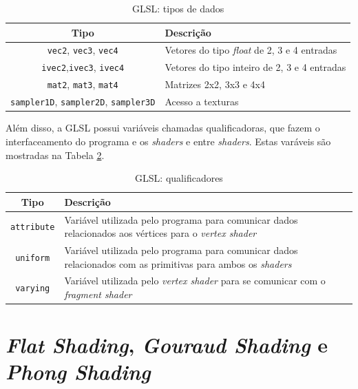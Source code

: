 \begin{table}[h]
	\centering	
	\begin{tabularx}{0.9\textwidth}{cX}
		\toprule
		\textbf{Tipo} & \textbf{Descrição}  \\
		\midrule
		\texttt{vec2}, \texttt{vec3}, \texttt{vec4} & Vetores do tipo \textit{float} de 2, 3 e 4 entradas \\
		\texttt{ivec2},\texttt{ivec3}, \texttt{ivec4} & Vetores do tipo inteiro de 2, 3 e 4 entradas \\
		\texttt{mat2}, \texttt{mat3}, \texttt{mat4} & Matrizes 2x2, 3x3 e 4x4 \\
		\texttt{sampler1D}, \texttt{sampler2D}, \texttt{sampler3D} & Acesso a texturas \\
		\bottomrule
	\end{tabularx}
	\caption{ GLSL: tipos de dados}
	\label{tiposglsl}
\end{table}

	Além disso, a GLSL possui variáveis chamadas qualificadoras, que fazem o interfaceamento do programa e os \textit{shaders} e entre \textit{shaders}. Estas varáveis são mostradas na Tabela \ref{tiposqualificadores}.

	\begin{table}[h]
	\centering	
	\begin{tabularx}{0.9\textwidth}{cX}
		\toprule
		\textbf{Tipo} & \textbf{Descrição}  \\
		\midrule
		\texttt{attribute} &  Variável utilizada pelo programa para comunicar dados relacionados aos vértices para o \textit{vertex shader}\\
		\texttt{uniform} &  Variável utilizada pelo programa para comunicar dados relacionados com as primitivas para ambos os \textit{shaders} \\
		\texttt{varying} &  Variável utilizada pelo \textit{vertex shader} para se comunicar com o \textit{fragment shader} \\
		\bottomrule
	\end{tabularx}
	\caption{ GLSL: qualificadores}
	\label{tiposqualificadores}
	\end{table}

\section{\textit{Flat Shading}, \textit{Gouraud Shading} e \textit{Phong Shading}}
\label{flatgouphon}

